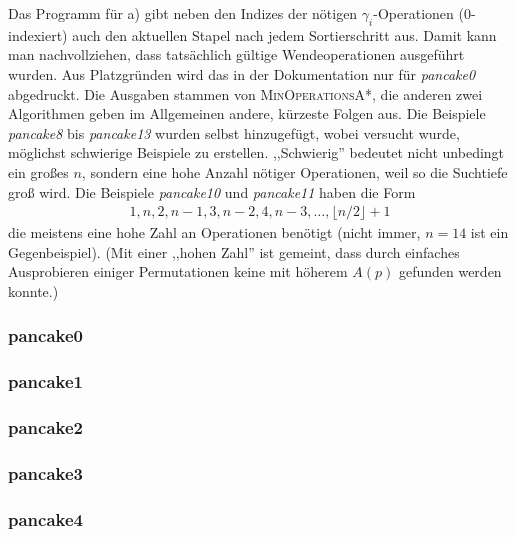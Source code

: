\documentclass[a4paper, 10pt, ngerman]{article}
\begin{document}
Das Programm für a) gibt neben den Indizes der nötigen $\gamma_i$-Operationen (0-indexiert) auch den aktuellen Stapel nach jedem Sortierschritt aus. Damit kann man nachvollziehen, dass tatsächlich gültige Wendeoperationen ausgeführt wurden. Aus Platzgründen wird das in der Dokumentation nur für \emph{pancake0} abgedruckt. Die Ausgaben stammen von \textsc{MinOperationsA*}, die anderen zwei Algorithmen geben im Allgemeinen andere, kürzeste Folgen aus. Die Beispiele \emph{pancake8} bis \emph{pancake13} wurden selbst hinzugefügt, wobei versucht wurde, möglichst schwierige Beispiele zu erstellen. ,,Schwierig'' bedeutet nicht unbedingt ein großes $n$, sondern eine hohe Anzahl nötiger Operationen, weil so die Suchtiefe groß wird. Die Beispiele \emph{pancake10} und \emph{pancake11} haben die Form
\begin{align*}
    1, n, 2, n - 1, 3, n - 2, 4, n - 3, \dots, \lfloor n/2 \rfloor + 1
\end{align*}
die meistens eine hohe Zahl an Operationen benötigt (nicht immer, $n = 14$ ist ein Gegenbeispiel). (Mit einer ,,hohen Zahl'' ist gemeint, dass durch einfaches Ausprobieren einiger Permutationen keine mit höherem $A(p)$ gefunden werden konnte.)

\subsubsection{pancake0}


\subsubsection{pancake1}


\subsubsection{pancake2}


\subsubsection{pancake3}


\subsubsection{pancake4}

\end{document}
